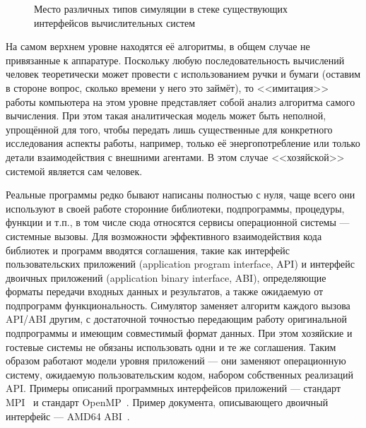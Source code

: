 \begin{figure}[htb]
    \centering
    \caption[Место различных типов симуляции]{Место различных типов симуляции в стеке существующих интерфейсов вычислительных систем}
    \label{fig:simulation-levels}
\end{figure}

На самом верхнем уровне находятся её алгоритмы, в общем случае не привязанные к аппаратуре. Поскольку любую последовательность вычислений человек теоретически может провести с использованием ручки и бумаги (оставим в стороне вопрос, сколько времени у него это займёт), то <<имитация>> работы компьютера на этом уровне представляет собой анализ алгоритма самого вычисления. При этом такая аналитическая модель может быть неполной, упрощённой для того, чтобы передать лишь существенные для конкретного исследования аспекты работы, например, только её энергопотребление или только детали взаимодействия с внешними агентами. В этом случае <<хозяйской>> системой является сам человек.

Реальные программы редко бывают написаны полностью с нуля, чаще всего они используют в своей работе сторонние библиотеки, подпрограммы, процедуры, функции и т.п., в том числе сюда относятся сервисы операционной системы --- системные вызовы. Для возможности эффективного взаимодействия кода библиотек и программ вводятся соглашения, такие как интерфейс пользовательских приложений (\abbr application program interface, API) и интерфейс двоичных приложений (\abbr application binary interface, ABI), определяющие форматы передачи входных данных и результатов, а также ожидаемую от подпрограмм функциональность. Симулятор заменяет алгоритм каждого вызова API/ABI другим, с достаточной точностью передающим работу оригинальной подпрограммы и имеющим совместимый формат данных. При этом хозяйские и гостевые системы не обязаны использовать одни и те же соглашения. Таким образом работают модели уровня приложений --- они заменяют операционную систему, ожидаемую пользовательским кодом, набором собственных реализаций API. Примеры описаний программных интерфейсов приложений --- стандарт MPI~\cite{mpi2std} и стандарт OpenMP~\cite{openmp}. Пример документа, описывающего двоичный интерфейс --- AMD64 ABI~\cite{x86-64-abi}.

